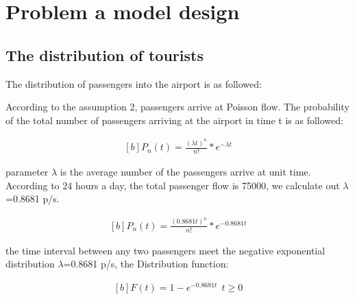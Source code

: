 
\section{Problem a model design}
\subsection{The distribution of tourists}
The distribution of passengers into the airport is as followed:
\par
According to the assumption 2, passengers arrive at Poisson flow. The probability of the total number of passengers arriving at the airport in time t is as followed:


\begin{equation}
\left.
\begin{aligned}[b]
	{P_{n}}(t)=\frac{(\lambda t)^{n}}{n!}*e^{-\lambda t}
\end{aligned}
\right.
\end{equation}

parameter $\lambda$ is the average number of the passengers arrive at unit time. According to 24 hours a day, the total passenger flow is 75000, we calculate out $\lambda$=0.8681 p/s.

\begin{equation}
\left.
\begin{aligned}[b]
	{P_{n}}(t)=\frac{(0.8681t)^{n}}{n!}*e^{-0.8681t}
\end{aligned}
\right.
\end{equation}

the time interval between any two passengers meet the negative exponential distribution $\lambda$=0.8681 p/s, the Distribution function:

\begin{equation}
\left.
\begin{aligned}[b]
	F(t)=1-e^{-0.8681t}~ ~t\geq 0
\end{aligned}
\right.
\end{equation}

